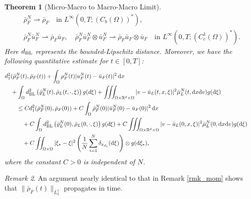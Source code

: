\documentclass[10pt, reqno]{amsart}
\newtheorem{theorem}{Theorem}[section]
\theoremstyle{definition}
\theoremstyle{remark}
\newtheorem{remark}[theorem]{Remark}
\numberwithin{equation}{section}
\newcommand{\dx}{\textnormal{d}x}
\newcommand{\dv}{\textnormal{d}v}
\newcommand{\dxi}{\textnormal{d}\xi}
\newcommand{\R}{\mathbb{R}}
\newcommand{\weakto}{\rightharpoonup}
\begin{document}
\begin{theorem}[Micro-Macro to Macro-Macro Limit]
\[\begin{split}
        &\bar \rho_F^N  \weakto \bar\rho_F  \quad \text{in }  L^\infty(0,T;(C_b(\Omega))^*),\\
        &\bar\rho_F^N \bar u_F^N  \weakto \bar\rho_F  \bar u_F, \quad \bar\rho_F^N \bar u_F^N \otimes \bar u_F^N  \weakto \bar\rho_F  \bar u_F \otimes \bar u_F    \quad \text{in }  L^\infty(0,T; (C_c^1(\Omega))^* ).
    \end{split}
\]%
Here $d_{\rm BL}$ represents the bounded-Lipschitz distance. Moreover, we have the following quantitative estimate for $t \in [0,T]$:
        \begin{align}\label{est_miMA}
&    d_1^2(\bar\rho^N_F(t), \bar\rho_F(t)) + \int_{\Omega} \rho^N_F(t) | u^N_F(t) - \bar u_F(t)|^2\, \dx \cr
&\quad + \int_{\Omega} d_{\rm BL}^2\left( \bar\varrho^N_L(t), \bar\rho_L(t,\cdot,\xi)\right)g(d\xi) + \iiint_{\Omega \times \R^d \times \Omega} |v - \bar u_L(t,x,\xi)|^2 \bar\mu_{L}^N(t,\dx\dv) g(\dxi)\cr
&\qquad  \leq C d_1^2(\bar\rho^N_F(0), \bar\rho_F(0)) + C \int_{\Omega} \bar \rho^N_F(0) | \bar u^N_F(0) - \bar u_F(0)|^2\, \dx \cr
&\qquad \quad + C\int_{\Omega} d_{\rm BL}^2\left( \bar\varrho^N_L(0), \bar\rho_L(0,\cdot,\xi)\right)g(d\xi) + C\iiint_{\Omega \times \R^d \times \Omega} |v - \bar u_L(0,x,\xi)|^2 \bar\mu_{L}^N(0,\dx\dv) g(\dxi)\cr
&\qquad \quad  + C \iint_{\Omega \times \Omega} |\xi_*-\xi|^2 \left(\frac{1}{N}\sum_{i=1}^N \delta_{x_{d_i}}(\dxi)\right)\otimes g(\dxi_*),
    \end{align}
where the constant $C > 0$ is independent of $N$. 
\end{theorem}

 
\begin{remark} An argument nearly identical to that in Remark \ref{rmk_mom} shows that $\|\bar \rho_F(t)\|_{L^1_2}$ propagates in time.
\end{remark}
 
\end{document}
